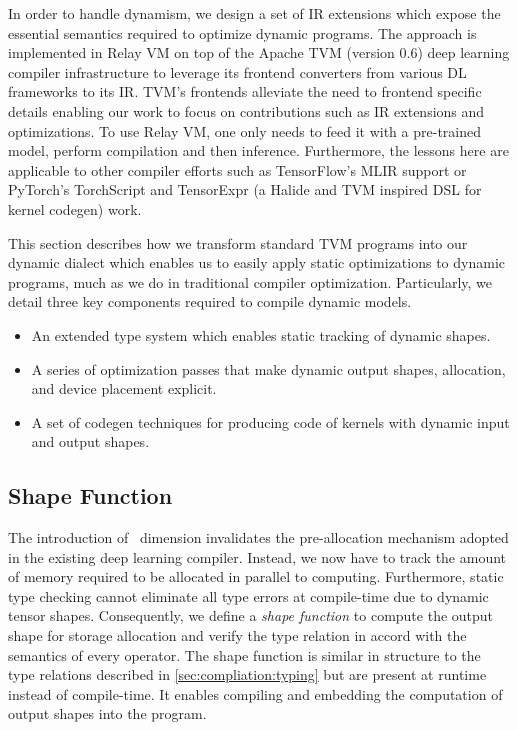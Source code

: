 In order to handle dynamism, we design a set of IR extensions which expose the essential semantics required to optimize dynamic programs.
The approach is implemented in Relay VM on top of the Apache TVM (version 0.6) deep learning compiler infrastructure \citep{tvm_osdi18} to leverage its frontend converters from various DL frameworks to its IR.
TVM's frontends alleviate the need to frontend specific details enabling our work to focus on contributions such as IR extensions and optimizations.
To use Relay VM, one only needs to feed it with a pre-trained model, perform compilation and then inference. Furthermore, the lessons
here are applicable to other compiler efforts such as TensorFlow's MLIR support or PyTorch's TorchScript and TensorExpr (a Halide and TVM inspired DSL for kernel codegen) work.

This section describes how we transform standard TVM programs into our dynamic dialect which enables us to easily apply static optimizations to dynamic programs, much as we do in traditional compiler optimization. Particularly, we detail three key components required to compile dynamic models.

\begin{itemize}
    \item An extended type system which enables static tracking of dynamic shapes.
    \item A series of optimization passes that make dynamic output shapes, allocation, and device placement explicit.
    \item A set of codegen techniques for producing code of kernels with dynamic input and output shapes.
\end{itemize}

\subsection{Shape Function}
\label{sec:compilation:shape-func}

The introduction of \any~dimension invalidates the pre-allocation mechanism adopted in the existing deep learning compiler.
Instead, we now have to track the amount of memory required to be allocated in parallel to computing.
Furthermore, static type checking cannot eliminate all type errors at compile-time due to dynamic tensor shapes.
Consequently, we define a {\em shape function} to compute the output shape for storage allocation and verify the type relation in accord with the semantics of every operator.
The shape function is similar in structure to the type relations described in \autoref{sec:compliation:typing} but are present at runtime instead of compile-time.
It enables compiling and embedding the computation of output shapes into the program.

